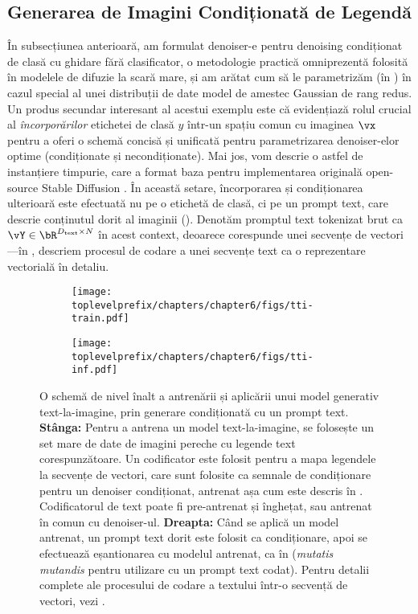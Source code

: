 \documentclass[../../book-main_ro.tex]{subfiles}
\begin{document}
\subsection{Generarea de Imagini Condiționată de Legendă}\label{sub:text-cond}

În subsecțiunea anterioară, am formulat denoiser-e pentru denoising condiționat
de clasă cu ghidare fără clasificator, o metodologie practică omniprezentă folosită
în modelele de difuzie la scară mare, și am arătat cum să le parametrizăm (în
) în cazul special al unei distribuții de date
model de amestec Gaussian de rang redus.
Un produs secundar interesant al acestui exemplu este că evidențiază rolul crucial
al \textit{încorporărilor} etichetei de clasă $y$ într-un spațiu comun cu imaginea $\vx$ pentru
a oferi o schemă concisă și unificată pentru parametrizarea denoiser-elor
optime (condiționate și necondiționate).
Mai jos, vom descrie o astfel de instanțiere timpurie, care
a format baza pentru implementarea originală open-source Stable Diffusion
\cite{rombach2022high}.
În această setare, încorporarea și condiționarea ulterioară este efectuată nu pe
o etichetă de clasă, ci pe un prompt text, care descrie conținutul dorit al imaginii
(). Denotăm promptul text tokenizat brut ca $\vY \in
\bR^{D_{\mathrm{text}} \times N}$ în acest context, deoarece corespunde unei secvențe de
vectori---în , descriem procesul de codare a unei secvențe
text ca o reprezentare vectorială în detaliu.

\begin{figure}[tbp]
  \centering
  \begin{subfigure}{0.47\textwidth}
    \texttt{[image: \\toplevelprefix/chapters/chapter6/figs/tti-train.pdf]}
    \caption{}
  \end{subfigure}
  \hfill
  \begin{subfigure}{0.47\textwidth}
    \texttt{[image: \\toplevelprefix/chapters/chapter6/figs/tti-inf.pdf]}
    \caption{}
  \end{subfigure}

  \caption{O schemă de nivel înalt a antrenării și aplicării unui model generativ
  text-la-imagine, prin generare condiționată cu un prompt text. \textbf{Stânga:}
  Pentru a antrena un model text-la-imagine, se folosește un set mare de date de imagini pereche cu
  legende text corespunzătoare. Un codificator este folosit pentru a mapa legendele la
  secvențe de vectori, care sunt folosite ca semnale de condiționare pentru un denoiser
  condiționat, antrenat așa cum este descris în . Codificatorul de text poate fi
  pre-antrenat și înghețat, sau antrenat în comun cu denoiser-ul. \textbf{Dreapta:}
  Când se aplică un model antrenat, un prompt text dorit este folosit ca condiționare,
  apoi se efectuează eșantionarea cu modelul antrenat, ca în
   (\textit{mutatis mutandis} pentru
  utilizare cu un prompt text codat). Pentru detalii complete ale procesului de codare
  a textului într-o secvență de vectori, vezi .}
  \label{fig:text-to-image}
\end{figure}
\end{document}
